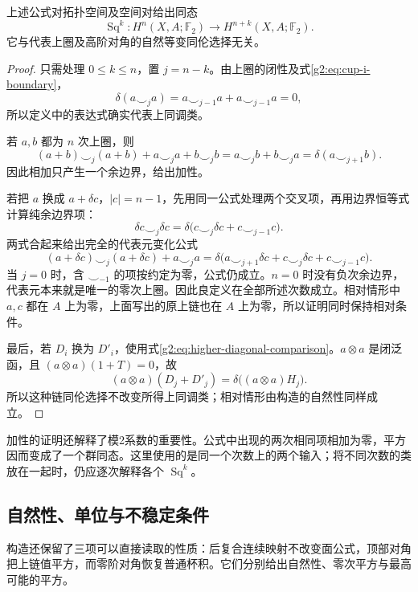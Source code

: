 \begin{theorem}\label{g2:thm:steenrod-squares}
	上述公式对拓扑空间及空间对给出同态
	\[
		\operatorname{Sq}^k:H^n(X,A;\mathbb F_2)\longrightarrow H^{n+k}(X,A;\mathbb F_2).
	\]
	它与代表上圈及高阶对角的自然等变同伦选择无关。
\end{theorem}
\begin{proof}
	只需处理 \(0\le k\le n\)，置 \(j=n-k\)。由上圈的闭性及式\eqref{g2:eq:cup-i-boundary}，
	\[
		\delta(a\smile_j a)=a\smile_{j-1}a+a\smile_{j-1}a=0,
	\]
	所以定义中的表达式确实代表上同调类。

	若 \(a,b\) 都为 \(n\) 次上圈，则
	\[
		(a+b)\smile_j(a+b)+a\smile_j a+b\smile_j b
		=a\smile_j b+b\smile_j a=\delta(a\smile_{j+1}b).
	\]
	因此相加只产生一个余边界，给出加性。

	若把 \(a\) 换成 \(a+\delta c\)，\(|c|=n-1\)，先用同一公式处理两个交叉项，再用边界恒等式计算纯余边界项：
	\[
		\delta c\smile_j\delta c
		=\delta\bigl(c\smile_j\delta c+c\smile_{j-1}c\bigr).
	\]
	两式合起来给出完全的代表元变化公式
	\[
		(a+\delta c)\smile_j(a+\delta c)+a\smile_j a
		=\delta\bigl(a\smile_{j+1}\delta c+c\smile_j\delta c+c\smile_{j-1}c\bigr).
	\]
	当 \(j=0\) 时，含 \(\smile_{-1}\) 的项按约定为零，公式仍成立。\(n=0\) 时没有负次余边界，代表元本来就是唯一的零次上圈。因此良定义在全部所述次数成立。相对情形中 \(a,c\) 都在 \(A\) 上为零，上面写出的原上链也在 \(A\) 上为零，所以证明同时保持相对条件。

	最后，若 \(D_i\) 换为 \(D'_i\)，使用式\eqref{g2:eq:higher-diagonal-comparison}。\(a\otimes a\) 是闭泛函，且 \((a\otimes a)(1+T)=0\)，故
	\[
		(a\otimes a)(D_j+D'_j)=\delta\bigl((a\otimes a)H_j\bigr).
	\]
	所以这种链同伦选择不改变所得上同调类；相对情形由构造的自然性同样成立。
\end{proof}

加性的证明还解释了模2系数的重要性。公式中出现的两次相同项相加为零，平方因而变成了一个群同态。这里使用的是同一个次数上的两个输入；将不同次数的类放在一起时，仍应逐次解释各个 \(\operatorname{Sq}^k\)。

\subsection{自然性、单位与不稳定条件}
\label{g2:subsec:1302:04}

构造还保留了三项可以直接读取的性质：后复合连续映射不改变面公式，顶部对角把上链值平方，而零阶对角恢复普通杯积。它们分别给出自然性、零次平方与最高可能的平方。

